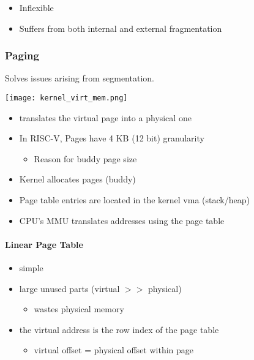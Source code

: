\begin{itemize}
    \item Inflexible
    \item Suffers from both internal and external fragmentation
\end{itemize}

\subsubsection{Paging}
Solves issues arising from segmentation.

\begin{center}
    \texttt{[image: kernel\_virt\_mem.png]}
\end{center}

\begin{itemize}
    \item translates the virtual page into a physical one
    \item In RISC-V, Pages have 4 KB (12 bit) granularity
          \begin{itemize}
              \item Reason for buddy page size
          \end{itemize}
    \item Kernel allocates pages (buddy)
    \item Page table entries are located in the kernel vma (stack/heap)
    \item CPU's MMU translates addresses using the page table
\end{itemize}

\paragraph{Linear Page Table}
\begin{itemize}
    \item simple
    \item large unused parts (virtual $>>$ physical)
          \begin{itemize}
              \item wastes physical memory
          \end{itemize}
    \item the virtual address is the row index of the page table
          \begin{itemize}
              \item virtual offset = physical offset within page
          \end{itemize}
\end{itemize}

